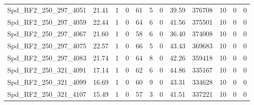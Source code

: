 \begin{longtable}[c]{@{}lrrrrrrrrrrr@{}}
Spd\_RF2\_250\_297\_4051      & 21.41                  & 1                       & 0                       & 61                     & 5                       & 0                       & 39.59                   & 376708                   & 10                       & 0                        & 0                        \\
Spd\_RF2\_250\_297\_4059      & 22.44                  & 1                       & 0                       & 64                     & 6                       & 0                       & 41.56                   & 375501                   & 10                       & 0                        & 0                        \\
Spd\_RF2\_250\_297\_4067      & 21.60                  & 1                       & 0                       & 58                     & 6                       & 0                       & 36.40                   & 374008                   & 10                       & 0                        & 0                        \\
Spd\_RF2\_250\_297\_4075      & 22.57                  & 1                       & 0                       & 66                     & 5                       & 0                       & 43.43                   & 369683                   & 10                       & 0                        & 0                        \\
Spd\_RF2\_250\_297\_4083      & 21.74                  & 1                       & 0                       & 64                     & 8                       & 0                       & 42.26                   & 359418                   & 10                       & 0                        & 0                        \\
Spd\_RF2\_250\_321\_4091      & 17.14                  & 1                       & 0                       & 62                     & 6                       & 0                       & 44.86                   & 335167                   & 10                       & 0                        & 0                        \\
Spd\_RF2\_250\_321\_4099      & 16.69                  & 1                       & 0                       & 60                     & 9                       & 0                       & 43.31                   & 334628                   & 10                       & 0                        & 0                        \\
Spd\_RF2\_250\_321\_4107      & 15.49                  & 1                       & 0                       & 57                     & 3                       & 0                       & 41.51                   & 337221                   & 10                       & 0                        & 0                        \\

\end{longtable}
